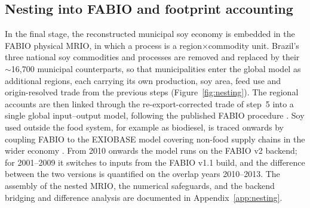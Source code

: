 \documentclass[pdflatex,sn-nature]{sn-jnl}%
\begin{document}
\subsection{Nesting into FABIO and footprint accounting}\label{subsec:fabio}
In the final stage, the reconstructed municipal soy economy is embedded in
the FABIO physical MRIO, in which a process is a
region$\times$commodity unit. Brazil's three national soy commodities and
processes are removed and replaced by their $\sim$16{,}700 municipal
counterparts, so that municipalities enter the global model as additional
regions, each carrying its own production, soy area, feed use and
origin-resolved trade from the previous steps (Figure~\ref{fig:nesting}).
The regional accounts are then linked through the re-export-corrected
trade of step~5 into a single global input--output model, following the
published FABIO procedure \cite{bruckner2019fabio}. Soy used outside the
food system, for example as biodiesel, is traced onwards by coupling FABIO
to the EXIOBASE model covering non-food supply chains in the wider economy \cite{stadler2018exiobase}.
From 2010 onwards the model runs on the FABIO
v2 backend; for 2001--2009 it switches to inputs from the FABIO v1.1 build,
and the difference between the two versions is quantified on the overlap years
2010--2013. The assembly of the nested MRIO, the numerical safeguards, and
the backend bridging and difference analysis are documented in
Appendix~\ref{app:nesting}.
\end{document}
